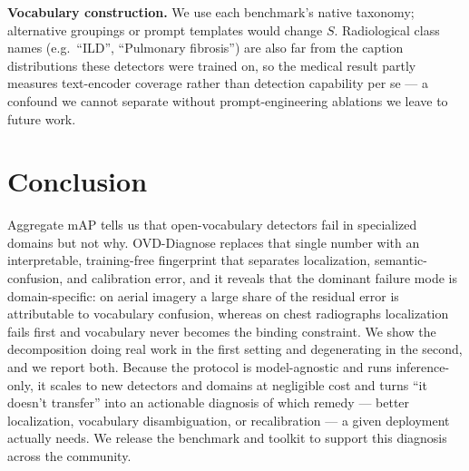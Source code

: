 \documentclass[10pt,twocolumn,letterpaper]{article}
\begin{document}
\textbf{Vocabulary construction.} We use each benchmark's native taxonomy; alternative
groupings or prompt templates would change $S$. Radiological class names
(e.g.\ ``ILD'', ``Pulmonary fibrosis'') are also far from the caption distributions these
detectors were trained on, so the medical result partly measures text-encoder coverage
rather than detection capability per se --- a confound we cannot separate without
prompt-engineering ablations we leave to future work.

\section{Conclusion}
\label{sec:conc}
Aggregate mAP tells us that open-vocabulary detectors fail in specialized domains but not
why. OVD-Diagnose replaces that single number with an interpretable, training-free
fingerprint that separates localization, semantic-confusion, and calibration error, and it
reveals that the dominant failure mode is domain-specific: on aerial imagery a large share
of the residual error is attributable to vocabulary confusion, whereas on chest radiographs
localization fails first and vocabulary never becomes the binding constraint. We show the
decomposition doing real work in the first setting and degenerating in the second, and we
report both. Because the protocol is model-agnostic and runs inference-only, it
scales to new detectors and domains at negligible cost and turns ``it doesn't transfer''
into an actionable diagnosis of which remedy --- better localization, vocabulary
disambiguation, or recalibration --- a given deployment actually needs. We release the
benchmark and toolkit to support this diagnosis across the community.

{\small

}
\end{document}
